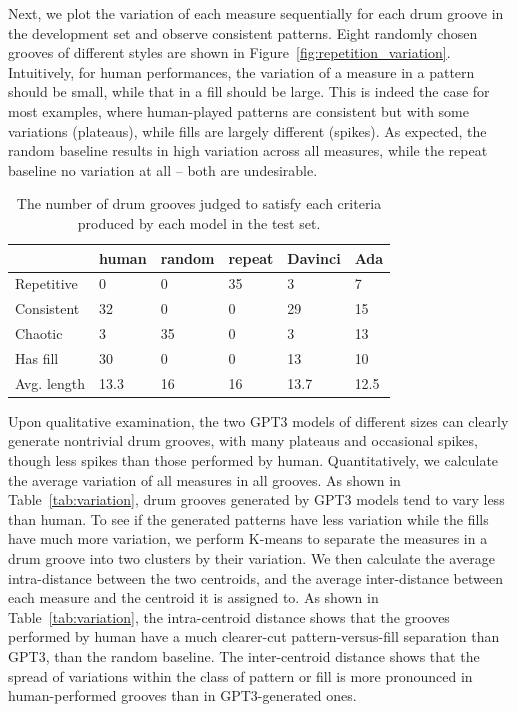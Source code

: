 \documentclass[letterpaper]{article} %
\begin{document}
Next, we plot the variation of each measure sequentially for each drum groove in the development set and observe consistent patterns. Eight randomly chosen grooves of different styles are shown in Figure~\ref{fig:repetition_variation}. Intuitively, for human performances, the variation of a measure in a pattern should be small, while that in a fill should be large. This is indeed the case for most examples, where human-played patterns are consistent but with some variations (plateaus), while fills are largely different (spikes). As expected, the random baseline results in high variation across all measures, while the repeat baseline no variation at all -- both are undesirable.

\begin{table}[t!]
\small
\centering
\begin{tabular}{llllll}
\toprule
            & human & random & repeat & Davinci & Ada \\ \midrule
Repetitive   &  0  &  0 & 35  & 3  &  7   \\
Consistent   &  32  &  0 & 0  & 29  &  15   \\
Chaotic   &  3  &  35 & 0  & 3  &  13   \\
Has fill   &  30  &  0  & 0  &  13  &  10  \\
Avg. length   &  13.3  &   16  & 16  &  13.7  &  12.5  \\
\bottomrule
\end{tabular}
\caption{The number of drum grooves judged to satisfy each criteria produced by each model in the test set.}
\label{tab:subjective}
\end{table}

Upon qualitative examination, the two GPT3 models of different sizes can clearly generate nontrivial drum grooves, with many plateaus and occasional spikes, though less spikes than those performed by human. Quantitatively, we calculate the average variation of all measures in all grooves. As shown in Table~\ref{tab:variation}, drum grooves generated by GPT3 models tend to vary less than human. To see if the generated patterns have less variation while the fills have much more variation, we perform K-means to separate the measures in a drum groove into two clusters by their variation. We then calculate the average intra-distance between the two centroids, and the average inter-distance between each measure and the centroid it is assigned to. As shown in Table~\ref{tab:variation}, the intra-centroid distance shows that the grooves performed by human have a much clearer-cut pattern-versus-fill separation than GPT3, than the random baseline. The inter-centroid distance shows that the spread of variations within the class of pattern or fill is more pronounced in human-performed grooves than in GPT3-generated ones.
\end{document}
